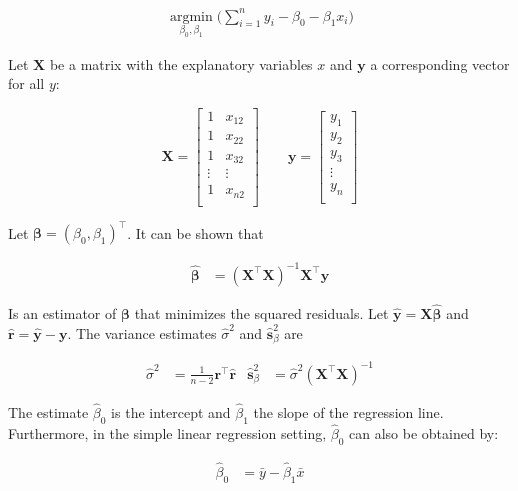 \documentclass[11pt,a4paper,twoside]{book}\usepackage[]{graphicx}\usepackage[]{color}
\begin{document}
\begin{align}
\operatorname*{argmin}_{\beta_0, \beta_1}\Big(\sum_{i = 1}^n y_i - \beta_0 - \beta_1 x_i\Big) \label{eq:least.squares}
\end{align}

Let $\mathbf{X}$ be a matrix with the explanatory variables $x$ and $\mathbf{y}$ a corresponding vector for all $y$:

\begin{equation*}
\mathbf{X} = 
\begin{bmatrix}
1 & x_{12} \\
1 & x_{22} \\
1 & x_{32} \\
\vdots & \vdots \\
1 & x_{n2} \\
\end{bmatrix} 
\qquad
\mathbf{y} = 
\begin{bmatrix}
y_1 \\
y_2 \\
y_3 \\
\vdots \\
y_n \\
\end{bmatrix}
\end{equation*}

Let $\mathbf{\beta} = (\beta_0, \beta_1)^\top$. It can be shown that 

\begin{align}
\hat{\mathbf{\beta}} &= (\mathbf{X}^\top \mathbf{X})^{-1} \mathbf{X}^\top \mathbf{y} \label{eq:regression.parameters}
\end{align}

Is an estimator of $\mathbf{\beta}$ that minimizes the squared residuals. Let $\hat{\mathbf{y}} = \mathbf{X}\hat{\mathbf{\beta}}$ and $\hat{\mathbf{r}} = \hat{\mathbf{y}} - \mathbf{y}$. The variance estimates $\hat{\sigma}^2$ and $\hat{\mathbf{s}}_\beta^2$ are

\begin{align}
\hat{\sigma}^2 &= \frac{1}{n-2}\mathbf{r}^\top \hat{\mathbf{r}} & \hat{\mathbf{s}}_\beta^2 &= \hat{\sigma}^2 (\mathbf{X}^\top \mathbf{X})^{-1} \label{eq:regression.variances}
\end{align}

The estimate $\hat{\beta}_0$ is the intercept and $\hat{\beta}_1$ the slope of the regression line. Furthermore, in the simple linear regression setting, $\hat{\beta}_0$ can also be obtained by:

\begin{align}
\hat{\beta}_0 &= \bar{y} - \hat{\beta}_1 \bar{x} \nonumber
\end{align}
\end{document}
